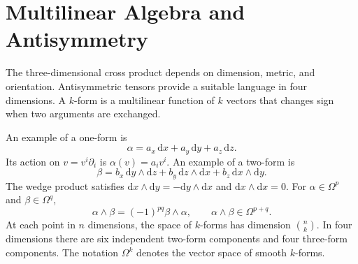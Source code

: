 \documentclass[11pt,openany]{book}
\numberwithin{equation}{chapter}
\theoremstyle{definition}
\theoremstyle{remark}
\newcommand{\dd}{\mathrm d}
\newcommand{\grad}{\operatorname{grad}}
\newcommand{\Div}{\operatorname{div}}
\newcommand{\curl}{\operatorname{curl}}
\begin{document}
\begin{center}
\end{center}

\section{Multilinear Algebra and Antisymmetry}
The three-dimensional cross product depends on dimension, metric, and orientation. Antisymmetric tensors provide a suitable language in four dimensions. A $k$-form is a multilinear function of $k$ vectors that changes sign when two arguments are exchanged.

An example of a one-form is
\begin{equation}
\alpha=a_x\,\dd x+a_y\,\dd y+a_z\,\dd z.
\end{equation}
Its action on $v=v^i\partial_i$ is $\alpha(v)=a_iv^i$. An example of a two-form is
\begin{equation}
\beta=b_x\,\dd y\wedge\dd z+b_y\,\dd z\wedge\dd x+b_z\,\dd x\wedge\dd y.
\end{equation}
The wedge product satisfies $\dd x\wedge\dd y=-\dd y\wedge\dd x$ and $\dd x\wedge\dd x=0$. For $\alpha\in\Omega^p$ and $\beta\in\Omega^q$,
\begin{equation}
\alpha\wedge\beta=(-1)^{pq}\beta\wedge\alpha,\qquad
\alpha\wedge\beta\in\Omega^{p+q}.
\end{equation}
At each point in $n$ dimensions, the space of $k$-forms has dimension $\binom nk$. In four dimensions there are six independent two-form components and four three-form components. The notation $\Omega^k$ denotes the vector space of smooth $k$-forms.
\end{document}
